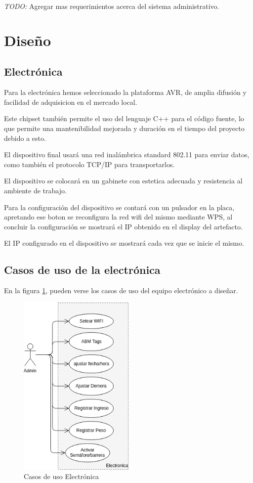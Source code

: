 \emph{TODO:} Agregar mas requerimientos acerca del sistema administrativo.

\section{Dise\~no}
\subsection{Electr\'onica}
Para la electr\'onica hemos seleccionado la plataforma AVR, de amplia difusi\'on y facilidad de adquisicion en el mercado local.

Este chipset tambi\'en permite el uso del lenguaje C++ para el c\'odigo fuente, lo que permite una mantenibilidad mejorada y duraci\'on en el tiempo del proyecto debido a esto.

El dispositivo final usar\'a una red inal\'ambrica standard 802.11 para enviar datos, como tambi\'en el protocolo TCP/IP para transportarlos.

El dispositivo se colocar\'a en un gabinete con estetica adecuada y resistencia al ambiente de trabajo.

Para la configuración del dispositivo se contará con un pulsador en la placa, apretando ese boton se reconfigura 
la red wifi del mismo mediante WPS, al concluir la configuración se mostrará el IP obtenido en el display del artefacto.

El IP configurado en el dispositivo se mostrará cada vez que se inicie el mismo.
\subsection{Casos de uso de la electr\'onica}
En la figura \ref{fig:usecase}, pueden verse los casos de uso del equipo electr\'onico a dise\~nar.
\begin{figure}[h!]
	\begin{center}
		\includegraphics[width=0.5\textwidth]{images/casos_uso_electronica.png}
		\caption{Casos de uso Electr\'onica}
		\label{fig:usecase}
	\end{center}
\end{figure}

